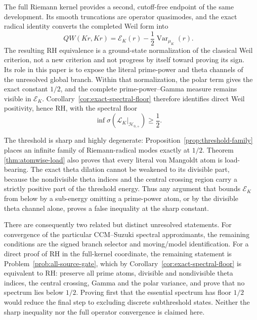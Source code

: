 \documentclass[11pt]{amsart}
\theoremstyle{definition}
\theoremstyle{remark}
\begin{document}
The full Riemann kernel provides a second, cutoff-free endpoint of the same
development.  Its smooth truncations are operator quasimodes, and the exact
radical identity converts the completed Weil form into
\[
 QW(Kr,Kr)
 =\mathscr E_K(r)-\frac12\operatorname{Var}_{\mu_K}(r).
\]
The resulting RH equivalence is a ground-state normalization of the
classical Weil criterion, not a new criterion and not progress by itself
toward proving its sign.  Its role in this paper is to expose the literal
prime-power and theta channels of the unresolved global branch.
Within that normalization, the polar term gives the exact constant
\(1/2\), and the complete
prime-power--Gamma measure remains visible in \(\mathscr E_K\).
Corollary~\ref{cor:exact-spectral-floor} therefore identifies direct Weil
positivity, hence RH, with the spectral floor
\[
 \inf\sigma(\mathcal L_K|_{\mathcal H_{0,+}})\ge\frac12.
\]

The threshold is sharp and highly degenerate:
Proposition~\ref{prop:threshold-family} places an infinite family of
Riemann-radical modes exactly at \(1/2\).  Theorem
\ref{thm:atomwise-load} also proves that every literal von Mangoldt atom is
load-bearing.  The exact theta dilation cannot be weakened to its divisible
part, because the nondivisible theta indices and the central crossing region
carry a strictly positive part of the threshold energy.  Thus any
argument that bounds \(\mathscr E_K\) from below by a sub-energy omitting
a prime-power atom, or by the divisible theta channel alone, proves a
false inequality at the sharp constant.

There are consequently two related but distinct unresolved statements.
For convergence of the particular CCM--Suzuki spectral approximants, the
remaining conditions are the signed branch selector and moving/model
identification.  For a direct proof of RH in the full-kernel coordinate, the
remaining statement is Problem~\ref{prob:all-source-gate}, which by
Corollary~\ref{cor:exact-spectral-floor} is equivalent to RH: preserve
all prime atoms, divisible and nondivisible theta indices, the central
crossing, Gamma and the polar variance, and prove that no spectrum lies
below \(1/2\).  Proving first that the essential spectrum has floor
\(1/2\) would reduce the final step to excluding discrete subthreshold
states.  Neither the sharp inequality nor the full operator convergence is
claimed here.
\end{document}
